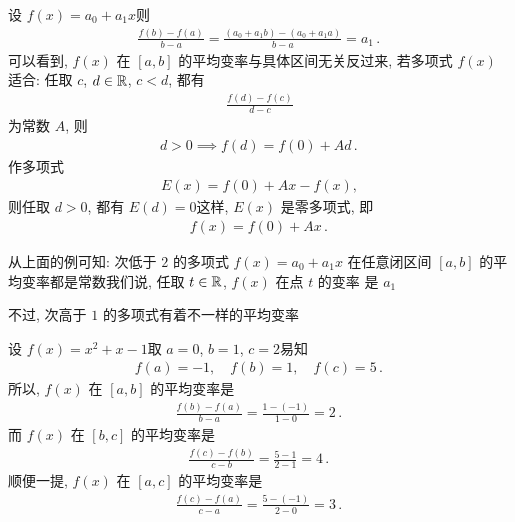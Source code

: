 \begin{example}
    设 $f(x) = a_0 + a_1 x$\period 则
    \begin{align*}
        \frac{f(b) - f(a)}{b - a} = \frac{(a_0 + a_1 b) - (a_0 + a_1 a)}{b - a} = a_1 \period
    \end{align*}
    可以看到, $f(x)$ 在 $[a, b]$ 的平均变率与具体区间无关\period 反过来, 若多项式 $f(x)$ 适合: 任取 $c$, $d \in \mathbb{R}$, $c < d$, 都有
    \begin{align*}
        \frac{f(d) - f(c)}{d - c}
    \end{align*}
    为常数 $A$, 则
    \begin{align*}
        d > 0 \implies f(d) = f(0) + Ad \period
    \end{align*}
    作多项式
    \begin{align*}
        E(x) = f(0) + Ax - f(x),
    \end{align*}
    则任取 $d > 0$, 都有 $E(d) = 0$\period 这样, $E(x)$ 是零多项式, 即
    \begin{align*}
        f(x) = f(0) + Ax \period
    \end{align*}
\end{example}

从上面的例可知: 次低于 $2$ 的多项式 $f(x) = a_0 + a_1 x$ 在任意闭区间 $[a, b]$ 的平均变率都是常数\period 我们说, 任取 $t \in \mathbb{R}$, $f(x)$ 在点 $t$ 的变率  是 $a_1$\period

不过, 次高于 $1$ 的多项式有着不一样的平均变率\period

\begin{example}
    设 $f(x) = x^2 + x - 1$\period 取 $a = 0$, $b = 1$, $c = 2$\period 易知
    \begin{align*}
        f(a) = -1, \quad f(b) = 1, \quad f(c) = 5 \period
    \end{align*}
    所以, $f(x)$ 在 $[a, b]$ 的平均变率是
    \begin{align*}
        \frac{f(b) - f(a)}{b - a} = \frac{1 - (-1)}{1 - 0} = 2 \period
    \end{align*}
    而 $f(x)$ 在 $[b, c]$ 的平均变率是
    \begin{align*}
        \frac{f(c) - f(b)}{c - b} = \frac{5 - 1}{2 - 1} = 4 \period
    \end{align*}
    顺便一提, $f(x)$ 在 $[a, c]$ 的平均变率是
    \begin{align*}
        \frac{f(c) - f(a)}{c - a} = \frac{5 - (-1)}{2 - 0} = 3 \period
    \end{align*}
\end{example}

